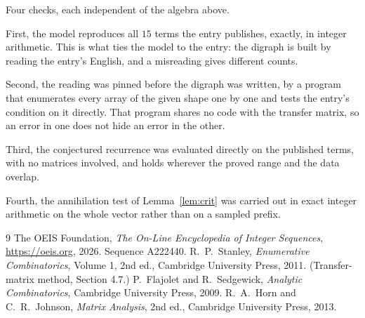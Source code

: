 \documentclass[11pt,a4paper]{article}
\theoremstyle{plain}
\theoremstyle{definition}
\begin{document}
Four checks, each independent of the algebra above.

First, the model reproduces all $15$ terms the entry publishes, exactly, in integer
arithmetic. This is what ties the model to the entry: the digraph is built by reading the
entry's English, and a misreading gives different counts.

Second, the reading was pinned before the digraph was written, by a program that enumerates
every array of the given shape one by one and tests the entry's condition on it directly. That program shares no code with the transfer matrix, so an error in one does not
hide an error in the other.

Third, the conjectured recurrence was evaluated directly on the published terms, with no
matrices involved, and holds wherever the proved range and the data overlap.

Fourth, the annihilation test of Lemma~\ref{lem:crit} was carried out in exact integer
arithmetic on the whole vector rather than on a sampled prefix.

\begin{thebibliography}{9}
 The OEIS Foundation, \emph{The On-Line Encyclopedia of Integer
Sequences}, \url{https://oeis.org}, 2026. Sequence A222440.
 R.~P.~Stanley, \emph{Enumerative Combinatorics}, Volume 1, 2nd ed.,
Cambridge University Press, 2011. (Transfer-matrix method, Section 4.7.)
 P.~Flajolet and R.~Sedgewick, \emph{Analytic Combinatorics}, Cambridge
University Press, 2009.
 R.~A.~Horn and C.~R.~Johnson, \emph{Matrix Analysis}, 2nd ed., Cambridge
University Press, 2013.
\end{thebibliography}
\end{document}
